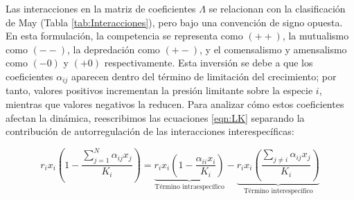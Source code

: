 Las interacciones en la matriz de coeficientes $\Lambda$ se relacionan con la clasificación de May (Tabla \eqref{tab:Interacciones}), pero bajo una convención de signo opuesta. En esta formulación, la competencia se representa como $(++)$, la mutualismo como $(--)$, la depredación como $(+-)$, y el comensalismo y amensalismo como $(-0)$ y $(+0)$ respectivamente. Esta inversión se debe a que los coeficientes $\alpha_{ij}$ aparecen dentro del término de limitación del crecimiento; por tanto, valores positivos incrementan la presión limitante sobre la especie $i$, mientras que valores negativos la reducen. Para analizar cómo estos coeficientes afectan la dinámica, reescribimos las ecuaciones \eqref{eqn:LK} separando la contribución de autorregulación de las interacciones interespecíficas:

\begin{equation}\label{eqn:LKextendida}
	r_ix_i\left (1-\frac{\sum_{j=1}^N\alpha_{ij}x_j}{K_i}\right ) = \underbrace{r_ix_i\left (1-\frac{\alpha_{ii}x_i}{K_i}\right )}_{\text{Término intraespecífico}}-\underbrace{r_ix_i\left (\frac{\sum_{j\neq i}\alpha_{ij}x_j}{K_i}\right )}_{\text{Término interespecífico}}
\end{equation}

